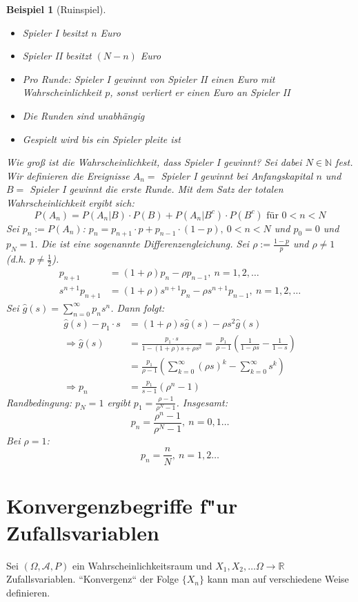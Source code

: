 \documentclass[a4paper,11pt]{book}
\newcommand{\R}{{\mathbb R}}
\newcommand{\N}{{\mathbb N}}
\def\AA{ \mathcal{A} }
\newtheorem{Bsp}{Beispiel}[chapter]
\theoremstyle{nonumberplain}
\begin{document}
\begin{Bsp}[Ruinspiel]
\begin{itemize}
\item Spieler I besitzt $n$ Euro
\item Spieler II besitzt $(N-n)$ Euro
\item Pro Runde: Spieler I gewinnt von Spieler II einen Euro mit Wahrscheinlichkeit $p$, sonst verliert er einen Euro an Spieler II
\item Die Runden sind unabhängig
\item Gespielt wird bis ein Spieler pleite ist
\end{itemize}
Wie groß ist die Wahrscheinlichkeit, dass Spieler I gewinnt? Sei dabei $N\in\N$ fest. Wir definieren die Ereignisse $A_n =$ Spieler I gewinnt bei Anfangskapital $n$ und $B =$ Spieler I gewinnt die erste Runde. Mit dem Satz der totalen Wahrscheinlichkeit ergibt sich:
\[ P(A_n) = P(A_n|B)\cdot P(B) + P(A_n|B^c)\cdot P(B^c) \text{ für } 0<n<N \]
Sei $p_n := P(A_n)$: $p_n = p_{n+1}\cdot p  + p_{n-1}\cdot (1-p), \ 0<n<N$ und $p_0=0$ und $p_N=1$. Die ist eine sogenannte Differenzengleichung. Sei $\rho := \frac{1-p}p$ und $\rho \ne 1$ (d.h. $p\ne\frac12$).
\begin{align*}
p_{n+1} &= (1+\rho)p_n - \rho p_{n-1}, \ n=1,2,\ldots \\
s^{n+1}p_{n+1} &= (1+\rho)s^{n+1}p_n - \rho s^{n+1}p_{n-1}, \ n=1,2,\ldots 
\end{align*}
Sei $\hat g (s) = \sum_{n=0}^\infty p_n s^n$. Dann folgt:
\begin{align*}
\hat g(s) -p_1\cdot s &= (1+\rho)s \hat g(s) - \rho s^2 \hat g(s) \\
\Rightarrow \hat g(s) &= \frac{p_1\cdot s}{1-(1+\rho)s+\rho s^2} = \frac{p_1}{\rho-1}\left(\frac1{1-\rho s} - \frac1{1-s}\right) \\
&= \frac{p_1}{\rho-1}\left( \sum_{k=0}^\infty (\rho s)^k - \sum_{k=0}^{\infty}s^k\right) \\
\Rightarrow p_n &= \frac{p_1}{s-1} (\rho^n-1)
\end{align*}
Randbedingung: $p_N=1$ ergibt $p_1=\frac{\rho-1}{\rho^N-1}$. Insgesamt:
\[ p_n = \frac{\rho^n-1}{\rho^N-1}, \ n=0,1\ldots \]
Bei $\rho=1$:
\[ p_n = \frac n N, \ n=1,2\ldots \]
\end{Bsp}

\chapter{Konvergenzbegriffe f"ur Zufallsvariablen}
Sei $(\Omega,\AA,P)$ ein Wahrscheinlichkeitsraum und $X_1,X_2,\ldots \Omega\to\R$ Zufallsvariablen. ``Konvergenz`` der Folge $\{X_n\}$ kann man auf verschiedene Weise definieren.
\end{document}
